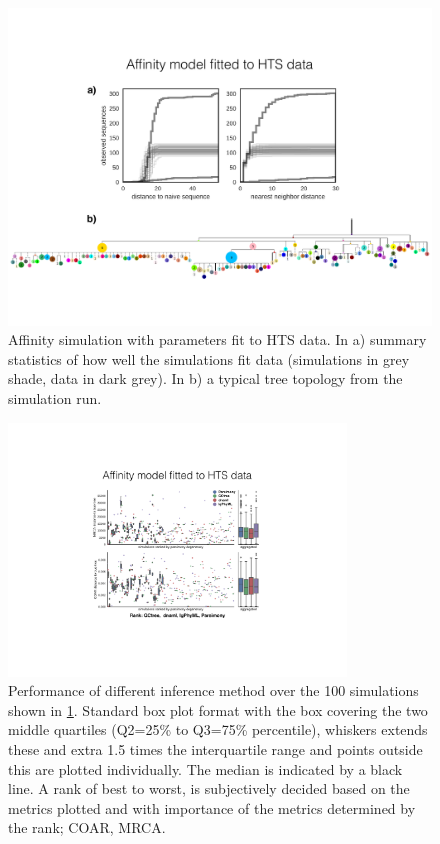\begin{figure}[!ht]
    \centering
    \includegraphics[width=1\textwidth]{figures/Laura-affsim_runstat.pdf}
    \caption{
        \label{fig:Laura-affsim_runstat}
        Affinity simulation with parameters fit to HTS data. In a) summary statistics of how well the simulations fit data (simulations in grey shade, data in dark grey). In b) a typical tree topology from the simulation run.
    }
\end{figure}
\begin{figure}[!ht]
    \centering
    \includegraphics[width=0.8\textwidth]{figures/Laura-affsim_vali.pdf}
    \caption{
        \label{fig:Laura-affsim_vali}
        Performance of different inference method over the 100 simulations shown in \ref{fig:Laura-affsim_runstat}.
        Standard box plot format with the box covering the two middle quartiles (Q2=25\% to Q3=75\% percentile), whiskers extends these and extra 1.5 times the interquartile range and points outside this are plotted individually.
        The median is indicated by a black line.
        A rank of best to worst, is subjectively decided based on the metrics plotted and with importance of the metrics determined by the rank; COAR, MRCA.
    }
\end{figure}







